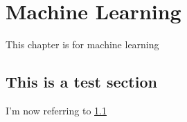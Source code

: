 \chapter{Machine Learning}
\label{chap:ml}

This chapter is for machine learning

\section{This is a test section}
\label{sec:test}

I'm now referring to \ref{sec:test}
